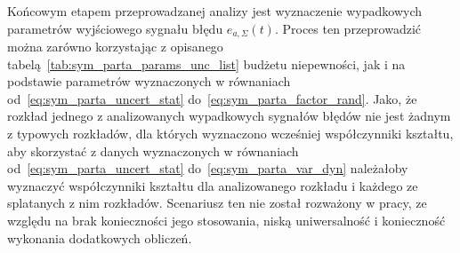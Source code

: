 Końcowym etapem przeprowadzanej analizy jest wyznaczenie wypadkowych parametrów wyjściowego sygnału błędu $e_{a,\Sigma}(t)$. Proces ten przeprowadzić można zarówno korzystając z opisanego tabelą~\ref{tab:sym_parta_params_unc_list} budżetu niepewności, jak i na podstawie parametrów wyznaczonych w równaniach od~\eqref{eq:sym_parta_uncert_stat} do~\eqref{eq:sym_parta_factor_rand}. Jako, że rozkład jednego z analizowanych wypadkowych sygnałów błędów nie jest żadnym z typowych rozkładów, dla których wyznaczono wcześniej współczynniki kształtu, aby skorzystać z danych wyznaczonych w równaniach od~\eqref{eq:sym_parta_uncert_stat} do~\eqref{eq:sym_parta_var_dyn} należałoby wyznaczyć współczynniki kształtu dla analizowanego rozkładu i każdego ze splatanych z nim rozkładów. Scenariusz ten nie został rozważony w pracy, ze względu na brak konieczności jego stosowania, niską uniwersalność i konieczność wykonania dodatkowych obliczeń.

